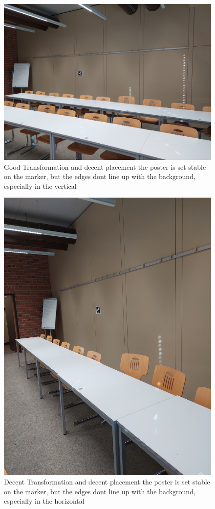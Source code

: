 \documentclass[a4paper,twocolumn]{article}
\begin{document}
    \begin{figure}[h!]
    \centering
    \includegraphics[width=0.9\columnwidth]{img/20221115_113401.jpg} %
    \caption{Good Transformation and decent placement the poster is set stable on the marker, but the edges dont line up with the background, especially in the vertical}
    \label{fig:20221115_113401.jpg}
    \end{figure}
    \begin{figure}[h!]
    \centering
    \includegraphics[width=0.9\columnwidth]{img/20221115_113412.jpg} %
    \caption{Decent Transformation and decent placement the poster is set stable on the marker, but the edges dont line up with the background, especially in the horizontal}
    \label{fig:20221115_113412.jpg}
    \end{figure}
    
\end{document}
